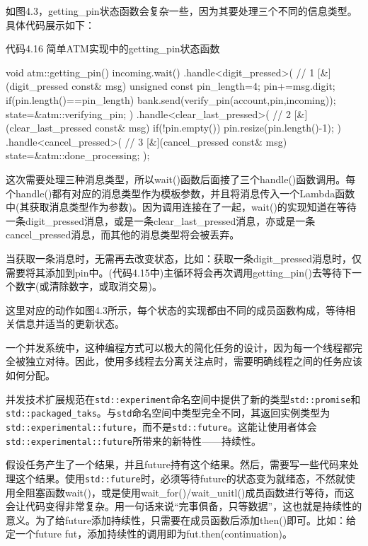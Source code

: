 如图4.3，getting\_pin状态函数会复杂一些，因为其要处理三个不同的信息类型。具体代码展示如下：

代码4.16 简单ATM实现中的getting\_pin状态函数

\begin{cpp}
void atm::getting_pin()
{
  incoming.wait()
    .handle<digit_pressed>(  // 1
      [&](digit_pressed const& msg)
      {
        unsigned const pin_length=4;
        pin+=msg.digit;
        if(pin.length()==pin_length)
        {
          bank.send(verify_pin(account,pin,incoming));
          state=&atm::verifying_pin;
        }
      }
      )
    .handle<clear_last_pressed>(  // 2
      [&](clear_last_pressed const& msg)
      {
        if(!pin.empty())
        {
          pin.resize(pin.length()-1);
        }
      }
      )
    .handle<cancel_pressed>(  // 3
      [&](cancel_pressed const& msg)
      {
        state=&atm::done_processing;
      }
      );
}
\end{cpp}

这次需要处理三种消息类型，所以wait()函数后面接了三个handle()函数调用。每个handle()都有对应的消息类型作为模板参数，并且将消息传入一个Lambda函数中(其获取消息类型作为参数)。因为调用连接在了一起，wait()的实现知道在等待一条digit\_pressed消息，或是一条clear\_last\_pressed消息，亦或是一条cancel\_pressed消息，而其他的消息类型将会被丢弃。

当获取一条消息时，无需再去改变状态，比如：获取一条digit\_pressed消息时，仅需要将其添加到pin中。(代码4.15中)主循环将会再次调用getting\_pin()去等待下一个数字(或清除数字，或取消交易)。

这里对应的动作如图4.3所示，每个状态的实现都由不同的成员函数构成，等待相关信息并适当的更新状态。

一个并发系统中，这种编程方式可以极大的简化任务的设计，因为每一个线程都完全被独立对待。因此，使用多线程去分离关注点时，需要明确线程之间的任务应该如何分配。


并发技术扩展规范在\texttt{std::experiment}命名空间中提供了新的类型\texttt{std::promise}和\texttt{std::packaged\_taks}。与\texttt{std}命名空间中类型完全不同，其返回实例类型为\texttt{std::experimental::future}，而不是\texttt{std::future}。这能让使用者体会\texttt{std::experimental::future}所带来的新特性——持续性。

假设任务产生了一个结果，并且future持有这个结果。然后，需要写一些代码来处理这个结果。使用\texttt{std::future}时，必须等待future的状态变为就绪态，不然就使用全阻塞函数wait()，或是使用wait\_for()/wait\_unitl()成员函数进行等待，而这会让代码变得非常复杂。用一句话来说“完事俱备，只等数据”，这也就是持续性的意义。为了给future添加持续性，只需要在成员函数后添加then()即可。比如：给定一个future fut，添加持续性的调用即为fut.then(continuation)。

